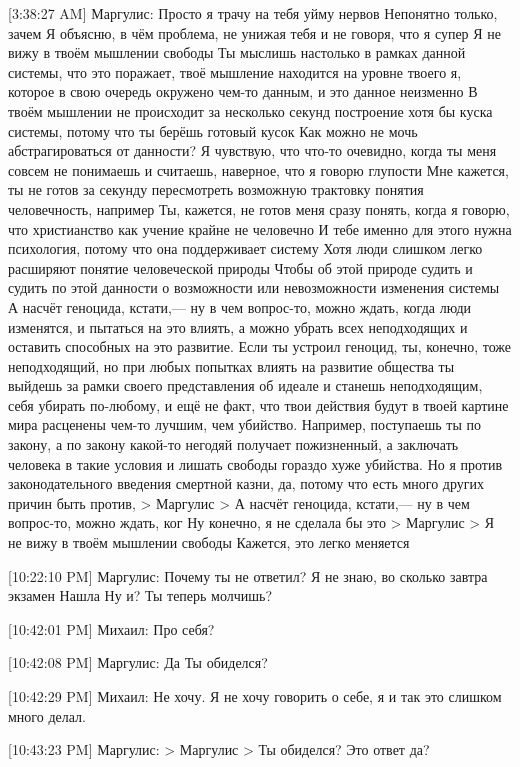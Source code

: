 \documentclass{article}
\begin{document}
[3:38:27 AM] Маргулис:
Просто я трачу на тебя уйму нервов
 Непонятно только, зачем
 Я объясню, в чём проблема, не унижая тебя и не говоря, что я супер
 Я не вижу в твоём мышлении свободы
 Ты мыслишь настолько в рамках данной системы, что это поражает, твоё мышление находится на уровне твоего я, которое в свою очередь окружено чем-то данным, и это данное неизменно
 В твоём мышлении не происходит за несколько секунд построение хотя бы куска системы, потому что ты берёшь готовый кусок
 Как можно не мочь абстрагироваться от данности?
 Я чувствую, что что-то очевидно, когда ты меня совсем не понимаешь и считаешь, наверное, что я говорю глупости
 Мне кажется, ты не готов за секунду пересмотреть возможную трактовку понятия человечность, например
 Ты, кажется, не готов меня сразу понять, когда я говорю, что христианство как учение крайне не человечно
 И тебе именно для этого нужна психология, потому что она поддерживает систему
 Хотя люди слишком легко расширяют понятие человеческой природы
 Чтобы об этой природе судить и судить по этой данности о возможности или невозможности изменения системы
 А насчёт геноцида, кстати,— ну в чем вопрос-то, можно ждать, когда люди изменятся, и пытаться на это влиять, а можно убрать всех неподходящих и оставить способных на это развитие. Если ты устроил геноцид, ты, конечно, тоже неподходящий, но при любых попытках влиять на развитие общества ты выйдешь за рамки своего представления об идеале и станешь неподходящим, себя убирать по-любому, и ещё не факт, что твои действия будут в твоей картине мира расценены чем-то лучшим, чем убийство. Например, поступаешь ты по закону, а по закону какой-то негодяй получает пожизненный, а заключать человека в такие условия и лишать свободы гораздо хуже убийства. Но я против законодательного введения смертной казни, да, потому что есть много других причин быть против,
> Маргулис
> А насчёт геноцида, кстати,— ну в чем вопрос-то, можно ждать, ког
Ну конечно, я не сделала бы это
> Маргулис
> Я не вижу в твоём мышлении свободы
Кажется, это легко меняется

[10:22:10 PM] Маргулис:
Почему ты не ответил?
 Я не знаю, во сколько завтра экзамен
 Нашла
 Ну и?
 Ты теперь молчишь?

[10:42:01 PM] Михаил:
Про себя?

[10:42:08 PM] Маргулис:
Да
 Ты обиделся?

[10:42:29 PM] Михаил:
Не хочу.
 Я не хочу говорить о себе, я и так это слишком много делал.

[10:43:23 PM] Маргулис:
> Маргулис
> Ты обиделся?
Это ответ да?
\end{document}
